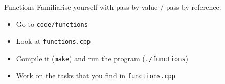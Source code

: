 \begin{frame}[fragile]
  \begin{exercise}{Functions}
    Familiarise yourself with pass by value / pass by reference.
    \begin{itemize}
      \item Go to \texttt{code/functions}
      \item Look at \texttt{functions.cpp}
      \item Compile it (\texttt{make}) and run the program (\texttt{./functions})
      \item Work on the tasks that you find in \texttt{functions.cpp}
    \end{itemize}
  \end{exercise}
\end{frame}

